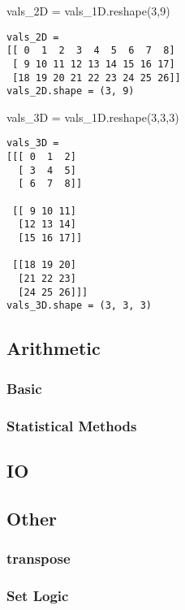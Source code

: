 \begin{python}
vals_2D = vals_1D.reshape(3,9)
\end{python}
\begin{lstlisting}[style=pyOutStyle]
vals_2D = 
[[ 0  1  2  3  4  5  6  7  8]
 [ 9 10 11 12 13 14 15 16 17]
 [18 19 20 21 22 23 24 25 26]]
vals_2D.shape = (3, 9)
\end{lstlisting}



\begin{python}
vals_3D = vals_1D.reshape(3,3,3)
\end{python}
\begin{lstlisting}[style=pyOutStyle]
vals_3D = 
[[[ 0  1  2]
  [ 3  4  5]
  [ 6  7  8]]

 [[ 9 10 11]
  [12 13 14]
  [15 16 17]]

 [[18 19 20]
  [21 22 23]
  [24 25 26]]]
vals_3D.shape = (3, 3, 3)
\end{lstlisting}


\subsection{Arithmetic}

\subsubsection{Basic}

\subsubsection{Statistical Methods}

\subsection{IO}



\subsection{Other}

\subsubsection{transpose}

\subsubsection{Set Logic}



